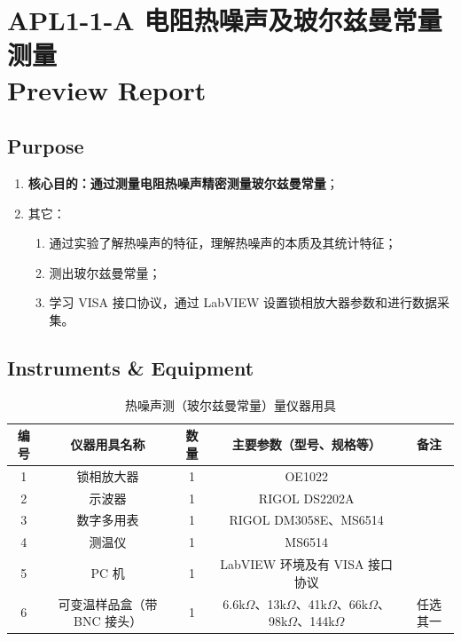 
\setcounter{section}{0}
\section{APL1-1-A 电阻热噪声及玻尔兹曼常量测量 \\ Preview Report}


\subsection{Purpose}
\begin{enumerate}
	\item \textbf{核心目的：通过测量电阻热噪声精密测量玻尔兹曼常量}；
	\item 其它：
	\begin{enumerate}
		\item 通过实验了解热噪声的特征，理解热噪声的本质及其统计特征；
		\item 测出玻尔兹曼常量；
		\item 学习 VISA 接口协议，通过 LabVIEW 设置锁相放大器参数和进行数据采集。
	\end{enumerate}
\end{enumerate}


\subsection{Instruments \& Equipment}
\begin{table}[h]
	\centering
	\caption{热噪声测（玻尔兹曼常量）量仪器用具}
	\begin{tabular}{ccccc}
		\hline
		\textbf{编号} & \textbf{仪器用具名称} & \textbf{数量} & \textbf{主要参数（型号、规格等）} & \textbf{备注} \\ \hline
		1 & 锁相放大器 & 1 & OE1022 & \\ 
		2 & 示波器 & 1 & RIGOL DS2202A & \\ 
		3 & 数字多用表 & 1 & RIGOL DM3058E、MS6514 & \\ 
		4 & 测温仪 & 1 & MS6514 & \\ 
		5 & PC 机 & 1 & LabVIEW 环境及有 VISA 接口协议 & \\ 
		6 & 可变温样品盒（带 BNC 接头） & 1 & 6.6k$\Omega$、13k$\Omega$、41k$\Omega$、66k$\Omega$、98k$\Omega$、144k$\Omega$ & 任选其一 \\ \hline
	\end{tabular}
\end{table}



